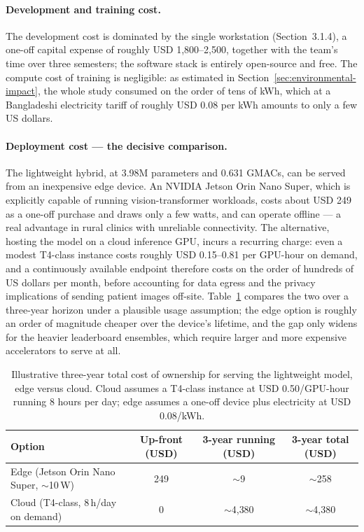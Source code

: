 \paragraph{Development and training cost.}
The development cost is dominated by the single workstation
(Section~3.1.4), a one-off capital expense of roughly USD 1{,}800--2{,}500,
together with the team's time over three semesters; the software stack is
entirely open-source and free. The compute cost of training is negligible: as
estimated in Section~\ref{sec:environmental-impact}, the whole study consumed
on the order of tens of kWh, which at a Bangladeshi electricity tariff of
roughly USD 0.08 per kWh amounts to only a few US dollars.

\paragraph{Deployment cost --- the decisive comparison.}
The lightweight hybrid, at 3.98M parameters and 0.631 GMACs, can be served
from an inexpensive edge device. An NVIDIA Jetson Orin Nano Super, which is
explicitly capable of running vision-transformer workloads, costs about
USD 249 as a one-off purchase and draws only a few watts, and can operate
offline --- a real advantage in rural clinics with unreliable connectivity.
The alternative, hosting the model on a cloud inference GPU, incurs a
recurring charge: even a modest T4-class instance costs roughly USD 0.15--0.81
per GPU-hour on demand, and a continuously available endpoint therefore costs
on the order of hundreds of US dollars per month, before accounting for data
egress and the privacy implications of sending patient images off-site.
Table~\ref{tab:tco} compares the two over a three-year horizon under a
plausible usage assumption; the edge option is roughly an order of magnitude
cheaper over the device's lifetime, and the gap only widens for the heavier
leaderboard ensembles, which require larger and more expensive accelerators to
serve at all.

\begin{table}[h]
\centering
\caption{Illustrative three-year total cost of ownership for serving the
lightweight model, edge versus cloud. Cloud assumes a T4-class instance at
USD 0.50/GPU-hour running 8 hours per day; edge assumes a one-off device plus
electricity at USD 0.08/kWh.}
\label{tab:tco}
\begin{tabular}{lccc}
\toprule
Option & Up-front (USD) & 3-year running (USD) & 3-year total (USD) \\
\midrule
Edge (Jetson Orin Nano Super, $\sim$10\,W) & 249 & $\sim$9   & $\sim$258 \\
Cloud (T4-class, 8\,h/day on demand)        & 0   & $\sim$4{,}380 & $\sim$4{,}380 \\
\bottomrule
\end{tabular}
\end{table}

